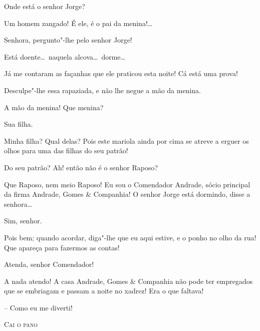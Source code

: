  Onde está o senhor Jorge?

  Um homem zangado! É ele, é o pai da
menina!\ldots

 Senhora, pergunto"-lhe pelo senhor Jorge!

 Está doente\ldots\ naquela alcova\ldots\ dorme\ldots

 Já me contaram as façanhas que ele praticou esta noite!
 Cá está uma prova!

 Desculpe"-lhe essa rapaziada, e não lhe negue a mão da
menina.

 A mão da menina! Que menina?

 Sua filha.

 Minha filha? Qual delas? Pois este mariola ainda por
cima se atreve a erguer os olhos para uma das filhas do seu patrão!

 Do seu patrão? Ah! então não é o senhor Raposo?

 Que Raposo, nem meio Raposo! Eu sou o Comendador
Andrade, sócio principal da firma Andrade, Gomes \& Companhia! O senhor
Jorge está dormindo, disse a senhora\ldots

 Sim, senhor.

 Pois bem; quando acordar, diga"-lhe que eu aqui estive, e
o ponho no olho da rua! Que apareça para fazermos as contas!

 Atenda, senhor Comendador!

 A nada atendo! A casa Andrade, Gomes \& Companhia não
pode ter empregados que se embriagam e passam a noite no xadrez! Era o
que faltava! 

\pagebreak 
{}


  – Como eu me diverti!

\bigskip
\begin{center}
\textsc{Cai o pano}
\end{center}
